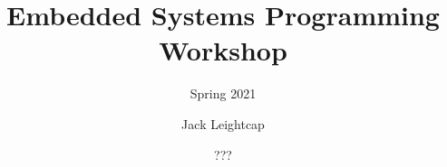 \documentclass{beamer} \usetheme{Madrid}
\title{Embedded Systems Programming Workshop}
\subtitle{Spring 2021}
\author[]{Jack Leightcap\inst{1}\inst{2}}
\institute[IEEE, Wireless Club]{
    \inst{1}IEEE -- \url{nuieeeofficers@gmail.com}
    \and
    \inst{2}Wireless Club -- \url{nuwirelessclub@gmail.com}
}
\date[Spring 2021]{???}
\begin{document}
\frame{\titlepage}
\end{document}
